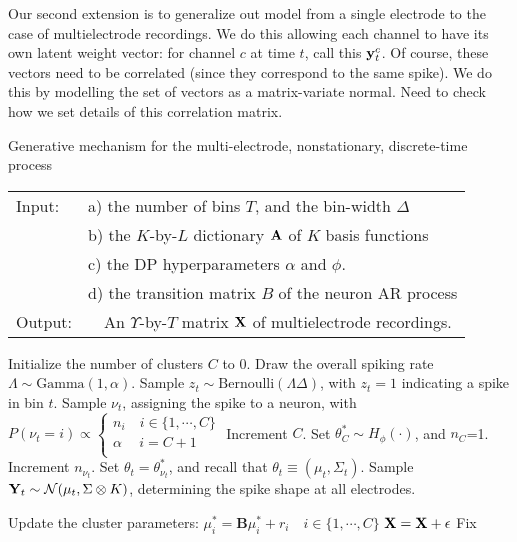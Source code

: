 Our second extension is to generalize out model from a single electrode to the case of multielectrode recordings. 
We do this allowing each channel to have its own latent weight vector: for channel $c$ at time $t$, call this $\mathbf{y}^c_t$.
Of course, these vectors need to be correlated (since they correspond to the same spike). We do this by modelling the set of
vectors as a matrix-variate normal.
{\color{red} Need to check how we set details of this correlation matrix}.

\begin{algorithm}
\caption{Generative mechanism for the multi-electrode, nonstationary, discrete-time process}\label{alg:gen_proc}
\begin{tabular}{p{1.2cm}p{12.4cm}}
Input:&  a) the number of bins $T$, and the bin-width $\Delta$\\
  &  b) the $K$-by-$L$ dictionary $\mathbf{A}$ of $K$ basis functions\\
  &  c) the DP hyperparameters $\alpha$ and $\phi$.\\ 
  &  d) the transition matrix $B$ of the neuron AR process \\
Output:& \ \ An $\Upsilon$-by-$T$ matrix $\mathbf{X}$ of multielectrode recordings. %
\end{tabular}
\begin{algorithmic}[1]
\State Initialize the number of clusters $C$ to $0$.
\State Draw the overall spiking rate $\Lambda \sim \text{Gamma}(1,\alpha)$.
\State Sample $z_t \sim \text{Bernoulli}(\Lambda \Delta)$, with $z_t = 1$ indicating a spike in bin $t$.
   \label{enum:thin}
  \State Sample $\nu_t$, assigning the spike to a neuron, with
$  P({\nu_t} = i) \propto 
  \begin{cases}
   n_i \quad i \in \{1,\cdots, C\} \\
   \alpha \quad\ i = C + 1 \\
  \end{cases}$
          \State Increment $C$. Set $\theta^*_{C} \sim H_{\phi}(\cdot)$, and $n_C$=1.
       \Else \State Increment $n_{\nu_t}$.
    \EndIf
\State Set $\theta_t = \theta^*_{\nu_t}$, and recall that $\theta_t \equiv (\mu_t, \Sigma_t)$.
\State Sample $\bY_t %
           \sim \mathcal{N}(\mu_t, \Sigma \otimes K)$, determining the spike shape at all electrodes.
\EndIf

\State Update the cluster parameters: ${\mu}^*_i = \mathbf{B} {\mu}^*_i + r_i \quad i \in \{1, \cdots, C\}$
\EndFor
\State $\mathbf{X} = \mathbf{X} + \mathbf{\epsilon}$ {\color{red} Fix}
\end{algorithmic}
\end{algorithm}

